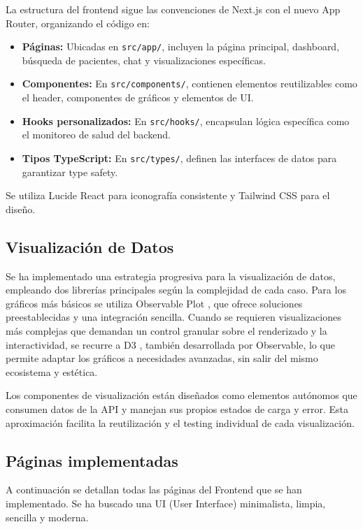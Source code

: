 La estructura del frontend sigue las convenciones de Next.js con el nuevo App Router, organizando el código en:

\begin{itemize}
\item \textbf{Páginas:} Ubicadas en \texttt{src/app/}, incluyen la página principal, dashboard, búsqueda de pacientes, chat y visualizaciones específicas.
\item \textbf{Componentes:} En \texttt{src/components/}, contienen elementos reutilizables como el header, componentes de gráficos y elementos de UI.
\item \textbf{Hooks personalizados:} En \texttt{src/hooks/}, encapsulan lógica específica como el monitoreo de salud del backend.
\item \textbf{Tipos TypeScript:} En \texttt{src/types/}, definen las interfaces de datos para garantizar type safety.
\end{itemize}

Se utiliza Lucide React para iconografía consistente y Tailwind CSS para el diseño.

\subsection{Visualización de Datos}

Se ha implementado una estrategia progresiva para la visualización de datos, empleando dos librerías principales según la complejidad de cada caso. Para los gráficos más básicos se utiliza Observable Plot \cite{observableplot}, que ofrece soluciones preestablecidas y una integración sencilla. Cuando se requieren visualizaciones más complejas que demandan un control granular sobre el renderizado y la interactividad, se recurre a D3 \cite{d3}, también desarrollada por Observable, lo que permite adaptar los gráficos a necesidades avanzadas, sin salir del mismo ecosistema y estética.

Los componentes de visualización están diseñados como elementos autónomos que consumen datos de la API y manejan sus propios estados de carga y error. Esta aproximación facilita la reutilización y el testing individual de cada visualización.


\subsection{Páginas implementadas}

A continuación se detallan todas las páginas del Frontend que se han implementado. Se ha buscado una UI (User Interface) minimalista, limpia, sencilla y moderna.


